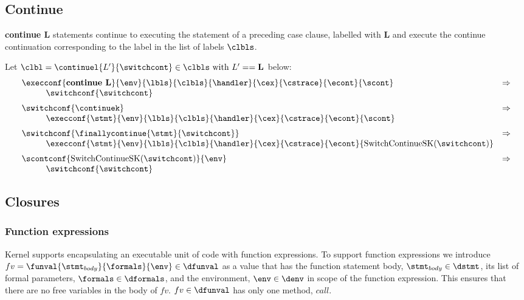 \documentclass{article}
\begin{document}
\subsection{Continue}
\textbf{continue L} statements continue to executing the statement of a preceding case clause, labelled with \textbf{L} and execute the continue continuation corresponding to the label in the list of labels $\clbls$.

Let $\clbl = \continuel{L'}{\switchcont} \in \clbls \textrm{ with } L' == \mathbf{L}$ below:
\[
  \begin{array}{lcl}
	\execconf{\textbf{continue L}}{\env}{\lbls}{\clbls}{\handler}{\cex}{\cstrace}{\econt}{\scont}
	& \Rightarrow \\
	\hspace{10mm}\switchconf{\switchcont}\\[2mm]

	\switchconf{\continuek}
	& \Rightarrow \\
	\hspace{10mm}\execconf{\stmt}{\env}{\lbls}{\clbls}{\handler}{\cex}{\cstrace}{\econt}{\scont}\\[2mm]

	\switchconf{\finallycontinue{\stmt}{\switchcont}}
	& \Rightarrow \\
	\hspace{10mm}\execconf{\stmt}{\env}{\lbls}{\clbls}{\handler}{\cex}{\cstrace}{\econt}{\mathrm{SwitchContinueSK}(\switchcont)}\\[2mm]

	\scontconf{\mathrm{SwitchContinueSK}(\switchcont)}{\env}
	& \Rightarrow \\
	\hspace{10mm}\switchconf{\switchcont}
  \end{array}
\]
\subsection{Closures}
\subsubsection{Function expressions}

Kernel supports encapsulating an executable unit of code with function expressions. To support function expressions we introduce $fv = \funval{\stmt_{body}}{\formals}{\env} \in \dfunval$ as a value that has the function statement body, $\stmt_{body} \in \dstmt$, its list of formal parameters, $\formals \in \dformals$, and the environment, $\env \in \denv$ in scope of the function expression. This ensures that there are no free variables in the body of $fv$. $fv \in \dfunval$ has only one method, $call$.
\end{document}

